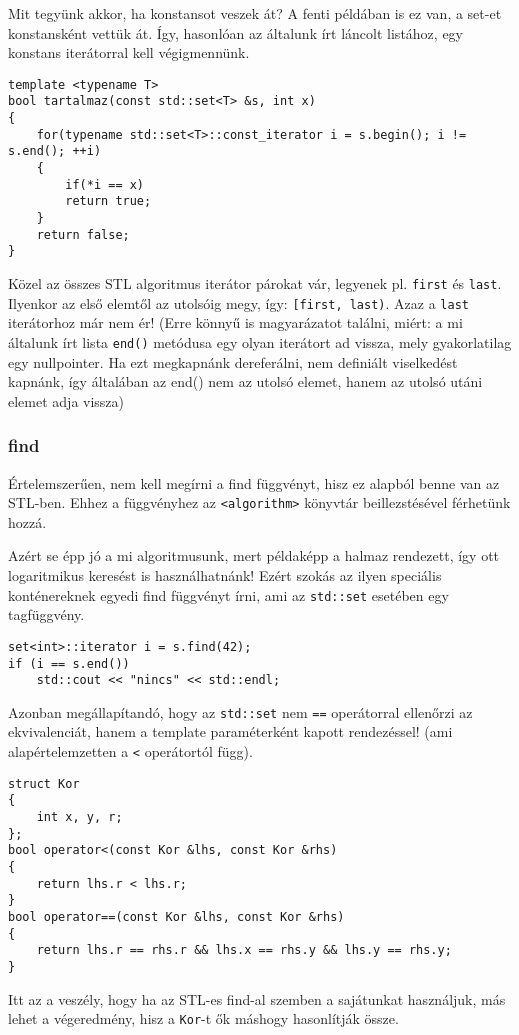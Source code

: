 \documentclass[a4paper,11.5pt]{article}
\begin{document}
	\smallskip
	Mit tegyünk akkor, ha konstansot veszek át? A fenti példában is ez van, a set-et konstansként vettük át. Így, hasonlóan az általunk írt láncolt listához, egy konstans iterátorral kell végigmennünk.
\begin{lstlisting}
template <typename T>
bool tartalmaz(const std::set<T> &s, int x)
{
	for(typename std::set<T>::const_iterator i = s.begin(); i != s.end(); ++i)
	{
		if(*i == x)
		return true;
	}
	return false;
}
\end{lstlisting}
	
	\medskip
	Közel az összes STL algoritmus iterátor párokat vár, legyenek pl. \texttt{first} és \texttt{last}. Ilyenkor az első elemtől az utolsóig megy, így: \texttt{[first, last)}. Azaz a \texttt{last} iterátorhoz már nem ér! (Erre könnyű is magyarázatot találni, miért: a mi általunk írt lista \texttt{end()} metódusa egy olyan iterátort ad vissza, mely gyakorlatilag egy nullpointer. Ha ezt megkapnánk dereferálni, nem definiált viselkedést kapnánk, így általában az end() nem az utolsó elemet, hanem az utolsó utáni elemet adja vissza)
	
	\subsubsection{find}
	Értelemszerűen, nem kell megírni a find függvényt, hisz ez alapból benne van az STL-ben. Ehhez a függvényhez az \texttt{<algorithm>} könyvtár beillezstésével férhetünk hozzá. 
	
	\medskip
	Azért se épp jó a mi algoritmusunk, mert példaképp a halmaz rendezett, így ott logaritmikus keresést is használhatnánk! Ezért szokás az ilyen speciális konténereknek egyedi find függvényt írni, ami az \texttt{std::set} esetében egy tagfüggvény. 
\begin{lstlisting}
set<int>::iterator i = s.find(42);
if (i == s.end())
	std::cout << "nincs" << std::endl;
\end{lstlisting}
	Azonban megállapítandó, hogy az \texttt{std::set} nem \texttt{==} operátorral ellenőrzi az ekvivalenciát, hanem a template paraméterként kapott rendezéssel! (ami alapértelemzetten a \texttt{<} operátortól függ).
\begin{lstlisting}
struct Kor
{
	int x, y, r;
};
bool operator<(const Kor &lhs, const Kor &rhs)
{
	return lhs.r < lhs.r;
}
bool operator==(const Kor &lhs, const Kor &rhs)
{
	return lhs.r == rhs.r && lhs.x == rhs.y && lhs.y == rhs.y;
}
\end{lstlisting}
	Itt az a veszély, hogy ha az STL-es find-al szemben a sajátunkat használjuk, más lehet a végeredmény, hisz a \texttt{Kor}-t ők máshogy hasonlítják össze.
	
\end{document}
